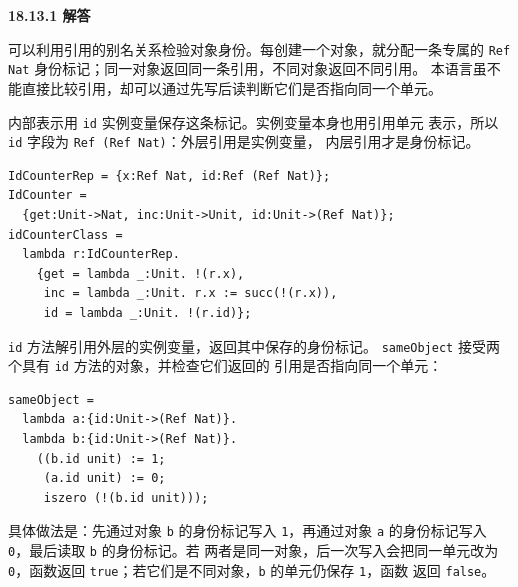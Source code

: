 \begin{taplauthorsolutionentrybox}
\label{sol:author:18.13.1}
\textbf{18.13.1 解答}

可以利用引用的别名关系检验对象身份。每创建一个对象，就分配一条专属的
\texttt{Ref Nat} 身份标记；同一对象返回同一条引用，不同对象返回不同引用。
本语言虽不能直接比较引用，却可以通过先写后读判断它们是否指向同一个单元。

内部表示用 \texttt{id} 实例变量保存这条标记。实例变量本身也用引用单元
表示，所以 \texttt{id} 字段为 \texttt{Ref (Ref Nat)}：外层引用是实例变量，
内层引用才是身份标记。

\begin{lstlisting}
IdCounterRep = {x:Ref Nat, id:Ref (Ref Nat)};
IdCounter =
  {get:Unit->Nat, inc:Unit->Unit, id:Unit->(Ref Nat)};
idCounterClass =
  lambda r:IdCounterRep.
    {get = lambda _:Unit. !(r.x),
     inc = lambda _:Unit. r.x := succ(!(r.x)),
     id = lambda _:Unit. !(r.id)};
\end{lstlisting}

\texttt{id} 方法解引用外层的实例变量，返回其中保存的身份标记。
\texttt{sameObject} 接受两个具有 \texttt{id} 方法的对象，并检查它们返回的
引用是否指向同一个单元：

\begin{lstlisting}
sameObject =
  lambda a:{id:Unit->(Ref Nat)}.
  lambda b:{id:Unit->(Ref Nat)}.
    ((b.id unit) := 1;
     (a.id unit) := 0;
     iszero (!(b.id unit)));
\end{lstlisting}

具体做法是：先通过对象 \texttt{b} 的身份标记写入 \texttt{1}，再通过对象
\texttt{a} 的身份标记写入 \texttt{0}，最后读取 \texttt{b} 的身份标记。若
两者是同一对象，后一次写入会把同一单元改为 \texttt{0}，函数返回
\texttt{true}；若它们是不同对象，\texttt{b} 的单元仍保存 \texttt{1}，函数
返回 \texttt{false}。


\end{taplauthorsolutionentrybox}
